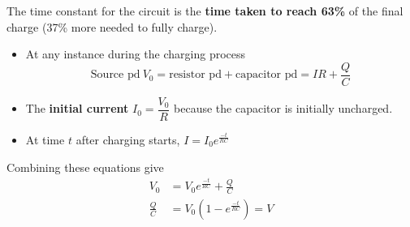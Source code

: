 The time constant for the circuit is the \textbf{time taken to reach 63\%} of the final charge (37\% more needed to fully charge).

\begin{itemize}
    \item At any instance during the charging process
        $$\text{Source pd}\ V_0=\text{resistor pd}+\text{capacitor pd}=IR+\frac{Q}{C}$$
    \item The \textbf{initial current} $I_0=\dfrac{V_0}{R}$ because the capacitor is initially uncharged.
    \item At time $t$ after charging starts, $I=\displaystyle I_0e^{\frac{-t}{RC}}$
\end{itemize}

Combining these equations give
\begin{align*}
    V_0&=V_0e^\frac{-t}{RC}+\frac{Q}{C}\\
    \frac{Q}{C}&=V_0\left(1-e^\frac{-t}{RC}\right)=V
\end{align*}
